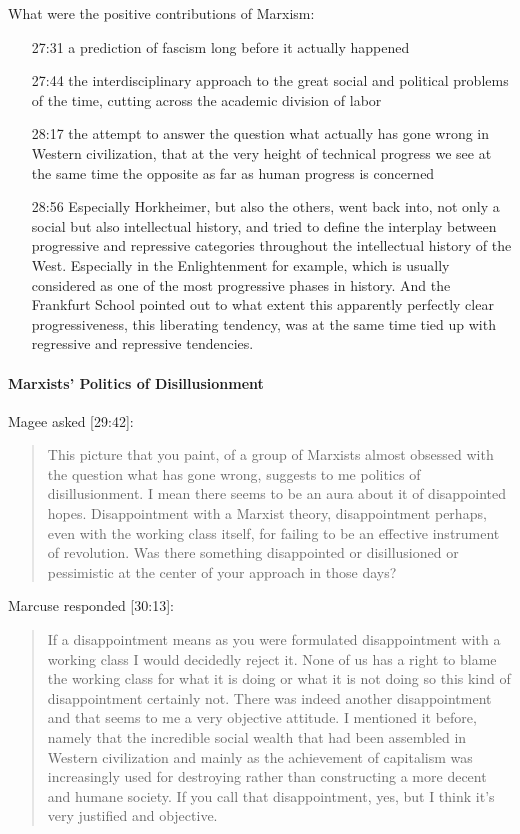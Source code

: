 \documentclass[10pt,titlepage]{book}
\begin{document}
What were the positive contributions of Marxism:
\begin{itemize}
\item[27:31] a prediction of fascism long before it actually happened
  \item[27:44] the interdisciplinary
approach to the great social and
political problems of the time, cutting
across the academic division of labor
\item[28:17]
the attempt to answer the question what actually has gone wrong in Western
civilization, that at the very height of technical progress we see at the same
time the opposite as far as human progress is concerned
\item[28:56] Especially Horkheimer, but also the others, went back into, not only
a social but also intellectual history, and tried to define the interplay
between progressive and repressive categories throughout the intellectual
history of the West.
Especially in the Enlightenment for example,
which is usually considered as one of the most progressive phases in history.
And the Frankfurt School pointed out to what extent this
apparently perfectly clear progressiveness, this liberating tendency,
was at the same time tied up with regressive and repressive tendencies. 
\end{itemize}

\paragraph{Marxists' Politics of Disillusionment}

Magee asked [29:42]:

\begin{quotation}
This picture that you paint, of a group of Marxists almost obsessed
with the question what has gone wrong, suggests to me politics of
disillusionment.
I mean there seems to be an aura about it of disappointed hopes.
Disappointment with a Marxist theory, disappointment perhaps,
even with the working class itself, for failing to be
an effective instrument of revolution.
Was there something disappointed or disillusioned or pessimistic at the
center of your approach in those days?
\end{quotation}

Marcuse responded [30:13]:

\begin{quotation}
If a disappointment means as you were
formulated disappointment with a working
class I would decidedly reject it.
None of us has a right to blame the working
class for what it is doing or what it is
not doing so this kind of disappointment
certainly not.
There was indeed another disappointment
and that seems to me a very objective attitude.
I mentioned it before, namely that the incredible
social wealth that had been assembled in
Western civilization and mainly as the
achievement of capitalism was
increasingly used for destroying rather
than constructing a more decent and
humane society.
If you call that disappointment, yes, but I think it's
very justified and objective.
\end{quotation}
\end{document}
